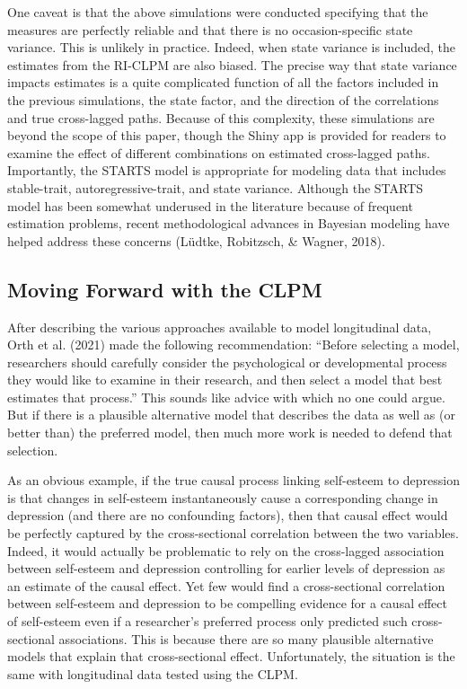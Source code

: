 \documentclass[
  english,
  man,floatsintext]{apa6}
\begin{document}
One caveat is that the above simulations were conducted specifying that the measures are perfectly reliable and that there is no occasion-specific state variance. This is unlikely in practice. Indeed, when state variance is included, the estimates from the RI-CLPM are also biased. The precise way that state variance impacts estimates is a quite complicated function of all the factors included in the previous simulations, the state factor, and the direction of the correlations and true cross-lagged paths. Because of this complexity, these simulations are beyond the scope of this paper, though the Shiny app is provided for readers to examine the effect of different combinations on estimated cross-lagged paths. Importantly, the STARTS model is appropriate for modeling data that includes stable-trait, autoregressive-trait, and state variance. Although the STARTS model has been somewhat underused in the literature because of frequent estimation problems, recent methodological advances in Bayesian modeling have helped address these concerns (Lüdtke, Robitzsch, \& Wagner, 2018).

\hypertarget{moving-forward-with-the-clpm}{%
\subsection{Moving Forward with the CLPM}\label{moving-forward-with-the-clpm}}

After describing the various approaches available to model longitudinal data, Orth et al. (2021) made the following recommendation: ``Before selecting a model, researchers should carefully consider the psychological or developmental process they would like to examine in their research, and then select a model that best estimates that process.'' This sounds like advice with which no one could argue. But if there is a plausible alternative model that describes the data as well as (or better than) the preferred model, then much more work is needed to defend that selection.

As an obvious example, if the true causal process linking self-esteem to depression is that changes in self-esteem instantaneously cause a corresponding change in depression (and there are no confounding factors), then that causal effect would be perfectly captured by the cross-sectional correlation between the two variables. Indeed, it would actually be problematic to rely on the cross-lagged association between self-esteem and depression controlling for earlier levels of depression as an estimate of the causal effect. Yet few would find a cross-sectional correlation between self-esteem and depression to be compelling evidence for a causal effect of self-esteem even if a researcher's preferred process only predicted such cross-sectional associations. This is because there are so many plausible alternative models that explain that cross-sectional effect. Unfortunately, the situation is the same with longitudinal data tested using the CLPM.
\end{document}
